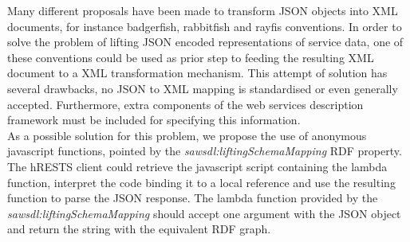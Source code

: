 Many different proposals have been made to transform JSON objects into XML documents, for instance badgerfish, rabbitfish and rayfis conventions. In order to solve the problem of lifting JSON encoded representations of service data, one of these conventions could be used as prior step to feeding the resulting XML document to a XML transformation mechanism. This attempt of solution has several drawbacks, no JSON to XML mapping is standardised or even generally accepted. Furthermore, extra components of the web services description framework must be included for specifying this information.\\
As a possible solution for this problem, we propose the use of anonymous javascript functions, pointed by the \emph{sawsdl:liftingSchemaMapping} RDF property. The hRESTS client could retrieve the javascript script containing the lambda function, interpret the code binding it to a local reference and use the resulting function to parse the JSON response. The lambda function provided by the \emph{sawsdl:liftingSchemaMapping} should accept one argument with the JSON object and return the string with the equivalent RDF graph.

